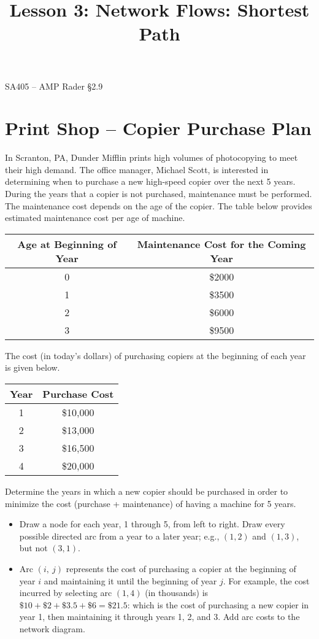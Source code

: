 \documentclass[11pt]{article}
\makeatletter
\theoremstyle{definition}
\renewcommand{\maketitle}{
  \noindent SA405 -- AMP \hfill Rader \S 2.9 \\

  \begin{center}\Large{\textbf{\@title}}\end{center}
}
\makeatother
\begin{document}
  
\title{Lesson 3: Network Flows:  Shortest Path}

\maketitle

\section{Print Shop -- Copier Purchase Plan}
In Scranton, PA, Dunder Mifflin prints high volumes of photocopying to meet their high demand. The office manager, Michael Scott, is interested in determining when to purchase a new high-speed copier over the next 5 years.  During the years that a copier is not purchased, maintenance must be performed.  The maintenance cost depends on the age of the copier.  The table below provides estimated maintenance cost per age of machine.

\begin{center}
\begin{tabular}{cc}
\hline
Age at Beginning of Year & Maintenance Cost for the Coming Year \\
\hline
0 & \$2000 \\
1 & \$3500 \\
2 & \$6000 \\
3 & \$9500 \\
\hline
\end{tabular}
\end{center}

The cost (in today's dollars) of purchasing copiers at the beginning of each year is given below.

\begin{center}
\begin{tabular}{cc}
\hline
Year & Purchase Cost \\
\hline
1 & \$10,000 \\
2 & \$13,000 \\
3 & \$16,500 \\
4 & \$20,000 \\
\hline
\end{tabular}
\end{center}

Determine the years in which a new copier should be purchased in order to minimize the cost (purchase + maintenance) of having a machine for 5 years.

\medskip

\begin{itemize}
\item Draw a node for each year, 1 through 5, from left to right.  Draw every possible directed arc from a year to a later year; e.g., $(1,2)$ and $(1,3)$, but not $(3,1)$.   \newpage


\item Arc $(i,~j)$ represents the cost of purchasing a copier at the beginning of year $i$ and maintaining it until the beginning of year $j$.  For example, the cost incurred by selecting arc $(1,4)$ (in thousands) is $\$10 + \$2 + \$3.5 + \$6 = \$21.5$: which is the cost of purchasing a new copier in year 1, then maintaining it through years 1, 2, and 3. Add arc costs to the network diagram. 
\end{itemize}
\end{document}
